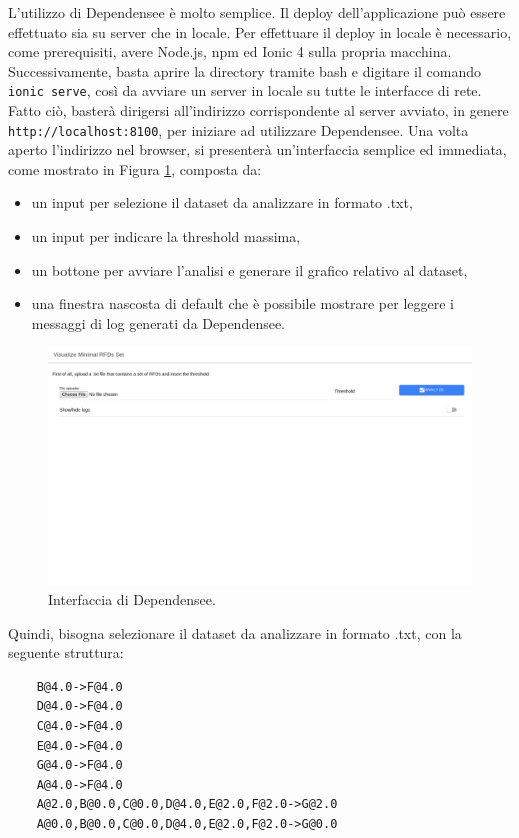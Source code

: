 L'utilizzo di Dependensee \`{e} molto semplice. Il deploy dell'applicazione pu\`{o} essere effettuato sia su server che in locale. Per effettuare il deploy in locale \`{e} necessario, come prerequisiti, avere Node.js, npm ed Ionic 4 sulla propria macchina. Successivamente, basta aprire la directory tramite bash e digitare il comando \texttt{ionic serve}, cos\`{i} da avviare un server in locale su tutte le interfacce di rete. Fatto ci\`{o}, baster\`{a} dirigersi all'indirizzo corrispondente al server avviato, in genere \texttt{http://localhost:8100}, per iniziare ad utilizzare Dependensee. Una volta aperto l'indirizzo nel browser, si presenter\`{a} un'interfaccia semplice ed immediata, come mostrato in Figura \ref{fig:dependensee_main_screen}, composta da:
\begin{itemize}
    \item un input per selezione il dataset da analizzare in formato .txt,
    \item un input per indicare la threshold massima,
    \item un bottone per avviare l'analisi e generare il grafico relativo al dataset,
    \item una finestra nascosta di default che \`{e} possibile mostrare per leggere i messaggi di log generati da Dependensee.
\end{itemize}
\begin{figure}[ht]
    \centering
    \includegraphics[width=\linewidth]{capitoli/figure/dependensee_main_screen}
    \caption{Interfaccia di Dependensee.}
    \label{fig:dependensee_main_screen}
\end{figure}
Quindi, bisogna selezionare il dataset da analizzare in formato .txt, con la seguente struttura:
\begin{verbatim}
    B@4.0->F@4.0
    D@4.0->F@4.0
    C@4.0->F@4.0
    E@4.0->F@4.0
    G@4.0->F@4.0
    A@4.0->F@4.0
    A@2.0,B@0.0,C@0.0,D@4.0,E@2.0,F@2.0->G@2.0
    A@0.0,B@0.0,C@0.0,D@4.0,E@2.0,F@2.0->G@0.0
\end{verbatim}
